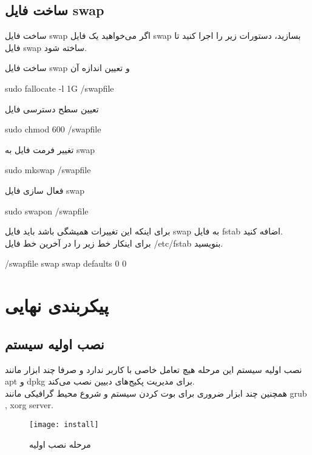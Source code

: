 \subsection{ساخت فایل swap}
\begin{frame}{ساخت فایل swap}
  اگر می‌خواهید یک فایل swap بسازید،‌ دستورات زیر را اجرا کنید تا فایل swap ساخته شود.
  \begin{alertblock}{ساخت فایل swap و تعیین اندازه آن}
    \begin{LTR}
    sudo fallocate -l 1G /swapfile
    \end{LTR}
  \end{alertblock}
  \begin{alertblock}{تعیین سطح دسترسی فایل}
    \begin{LTR}
    sudo chmod 600 /swapfile
    \end{LTR}
  \end{alertblock}
  \begin{alertblock}{تغییر فرمت فایل به swap}
    \begin{LTR}
    sudo mkswap /swapfile
    \end{LTR}
  \end{alertblock}
  \begin{alertblock}{فعال سازی فایل swap}
    \begin{LTR}
    sudo swapon /swapfile
    \end{LTR}
  \end{alertblock}  
  برای اینکه این تغییرات همیشگی باشد باید فایل swap به فایل fstab اضافه کنید.\\
  برای اینکار خط زیر را در آخرین خط فایل /etc/fstab بنویسید.
  \begin{LTR}
    /swapfile swap swap defaults 0 0
  \end{LTR}
\end{frame}

\section{پیکربندی نهایی}
\subsection{نصب اولیه سیستم}
\begin{frame}{نصب اولیه سیستم}
  این مرحله هیچ تعامل خاصی با کاربر ندارد و صرفا چند ابزار مانند apt و dpkg برای مدیریت پکیج‌های دبیین نصب می‌کند.\\
  همچنین چند ابزار ضروری برای بوت کردن سیستم و شروع محیط‌ گرافیکی مانند grub , xorg server.\\
  \begin{figure}
    \texttt{[image: install]}
    \caption{مرحله نصب اولیه~\cite{fig:deb_install}}
  \end{figure}
\end{frame}

